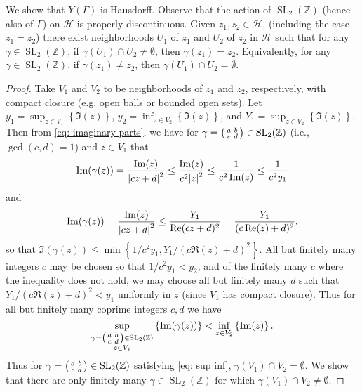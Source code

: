 \documentclass[10pt,leqno]{article}
\newcommand{\cbr}[1]{\left\{#1\right\}}
\DeclareMathOperator{\SL}{SL}
\begin{document}
We show that $Y(\varGamma)$ is Hausdorff. Observe that the action of $\SL_2(\mathbb{Z})$ (hence also of $\varGamma$) on $\mathcal H$ is properly discontinuous. Given $z_1,z_2\in \mathcal H$, (including the case $z_1 = z_2$) there exist neighborhoods $U_1$ of $z_1$ and $U_2$ of $z_2$ in $\mathcal H$ such that for any $\gamma\in \SL_2(\mathbb{Z})$, if $\gamma(U_1)\cap U_2\neq \emptyset$, then $\gamma(z_1) = z_2$. Equivalently, for any $\gamma\in\SL_2(\mathbb{Z})$, if $\gamma(z_1)\neq z_2$, then $\gamma(U_1)\cap U_2= \emptyset$.
\begin{proof}
    Take $V_1$ and $V_2$ to be neighborhoods of $z_1$ and $z_2$, respectively, with compact closure (e.g. open balls or bounded open sets). Let $y_1 = \sup_{z\in V_1}\cbr{\Im(z)}$, $y_2 = \inf_{z\in V_2}\cbr{\Im(z)}$, and $Y_1 = \sup_{z\in V_2}\cbr{\Im(z)}$. Then from \cref{eq: imaginary parts}, we have for $\gamma = \begin{psmallmatrix}
        a & b \\ c & d
    \end{psmallmatrix}\in \SL_2(\mathbb{Z})$ (i.e., $\gcd(c,d) = 1$) and $z\in V_1$ that \[\Im(\gamma(z)) = \frac{\Im(z)}{\abs{cz+d}^2}\leq \frac{\Im(z)}{c^2\abs{z}^2}\leq \frac{1}{c^2\Im(z)}\leq \frac{1}{c^2y_1}\] and \[\Im(\gamma(z)) = \frac{\Im(z)}{\abs{cz+d}^2}\leq \frac{Y_1}{\Re(cz+d)^2} = \frac{Y_1}{(c\Re(z)+d)^2},\] so that $\Im(\gamma(z))\leq\min\cbr{1/c^2y_1,Y_1/(c\Re(z)+d)^2}$. All but finitely many integers $c$ may be chosen so that $1/c^2y_1< y_2$, and of the finitely many $c$ where the inequality does not hold, we may choose all but finitely many $d$ such that $Y_1/(c\Re(z)+d)^2< y_1$ uniformly in $z$ (since $V_1$ has compact closure). Thus for all but finitely many coprime integers $c,d$ we have \begin{equation}\label{eq: sup inf}
        \sup_{\substack{\gamma  = \begin{psmallmatrix}
            a & b \\ c & d
        \end{psmallmatrix}\in \SL_2(\mathbb{Z})\\z\in V_1}}\cbr{\Im(\gamma(z))}< \inf_{z\in V_2}\cbr{\Im(z)}.
    \end{equation} Thus for $\gamma = \begin{psmallmatrix}
        a & b \\ c & d
    \end{psmallmatrix}\in \SL_2(\mathbb{Z})$ satisfying \cref{eq: sup inf}, $\gamma(V_1)\cap V_2=\emptyset$. We show that there are only finitely many $\gamma\in \SL_2(\mathbb{Z})$ for which $\gamma(V_1)\cap V_2\neq\emptyset$.


\end{proof}
\end{document}
